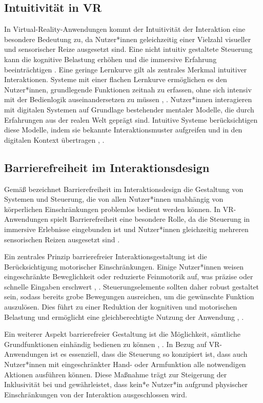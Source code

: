 \subsection{Intuitivität in VR}
In Virtual-Reality-Anwendungen kommt der Intuitivität der Interaktion eine besondere Bedeutung zu, da Nutzer*innen geleichzeitig einer Vielzahl visueller und sensorischer Reize ausgesetzt sind. Eine nicht intuitiv gestaltete Steuerung kann die kognitive Belastung erhöhen und die immersive Erfahrung beeinträchtigen \cite{Jason2015}.
Eine geringe Lernkurve gilt als zentrales Merkmal intuitiver Interaktionen. Systeme mit einer flachen Lernkurve ermöglichen es den Nutzer*innen, grundlegende Funktionen zeitnah zu erfassen, ohne sich intensiv mit der Bedienlogik auseinandersetzen zu müssen \cite{Jason2015}, \cite{Weibelzahl2025}.
Nutzer*innen interagieren mit digitalen Systemen auf Grundlage bestehender mentaler Modelle, die durch Erfahrungen aus der realen Welt geprägt sind. Intuitive Systeme berücksichtigen diese Modelle, indem sie bekannte Interaktionsmuster aufgreifen und in den digitalen Kontext übertragen \cite{Jason2015}, \cite{Norman2002}.

\subsection{Barrierefreiheit im Interaktionsdesign}
Gemäß \cite{Clarkson2003} bezeichnet Barrierefreiheit im Interaktionsdesign die Gestaltung von Systemen und Steuerung, die von allen Nutzer*innen unabhängig von körperlichen Einschränkungen problemlos bedient werden können. In VR-Anwendungen spielt Barrierefreiheit eine besondere Rolle, da die Steuerung in immersive Erlebnisse eingebunden ist und Nutzer*innen gleichzeitig mehreren sensorischen Reizen ausgesetzt sind \cite{Jason2015}.

Ein zentrales Prinzip barrierefreier Interaktionsgestaltung ist die Berücksichtigung motorischer Einschränkungen. Einige Nutzer*innen weisen eingeschränkte Beweglichkeit oder reduzierte Feinmotorik auf, was präzise oder schnelle Eingaben erschwert \cite{Clarkson2003}, \cite{ISO2025}. Steuerungselemente sollten daher robust gestaltet sein, sodass bereits grobe Bewegungen ausreichen, um die gewünschte Funktion auszulösen. Dies führt zu einer Reduktion der kognitiven und motorischen Belastung und ermöglicht eine gleichberechtigte Nutzung der Anwendung \cite{Clarkson2003}, \cite{ISO2025}.

Ein weiterer Aspekt barrierefreier Gestaltung ist die Möglichkeit, sämtliche Grundfunktionen einhändig bedienen zu können \cite{Clarkson2003}, \cite{Molly1998}. In Bezug auf VR-Anwendungen ist es essenziell, dass die Steuerung so konzipiert ist, dass auch Nutzer*innen mit eingeschränkter Hand- oder Armfunktion alle notwendigen Aktionen ausführen können. Diese Maßnahme trägt zur Steigerung der Inklusivität bei und gewährleistet, dass kein*e Nutzer*in aufgrund physischer Einschränkungen von der Interaktion ausgeschlossen wird.

